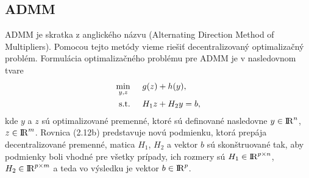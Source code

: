 \subsection{ADMM}
\label{subse:ADMM}
ADMM je skratka z anglického názvu (Alternating Direction Method of Multipliers). Pomocou tejto metódy vieme riešiť decentralizovaný optimalizačný problém.
Formulácia optimalizačného problému pre ADMM je v nasledovnom tvare
\begin{subequations}
	\begin{align}
		\displaystyle \min_{y,z} \hspace{0.5cm} & 
		g(z) + h(y),\\
		\textrm{s.t.} \hspace{0.5cm} & H_{1}z + H_{2}y = b,
	\end{align}
\end{subequations}
kde $y$ a $z$ sú optimalizované premenné, ktoré sú definované nasledovne $y \in {\rm I\!R}^n $, $ z\in {\rm I\!R}^m$. Rovnica (2.12b) predstavuje novú podmienku, ktorá prepája decentralizované premenné, matica $H_{1}$, $H_{2}$ a vektor $b$ sú skonštruované tak, aby podmienky boli vhodné pre všetky prípady, ich rozmery sú $H_{1} \in {\rm I\!R}^{p \times n}$, $H_{2} \in {\rm I\!R}^{p \times m}$ a teda vo výsledku je vektor $b \in {\rm I\!R}^p $. 


